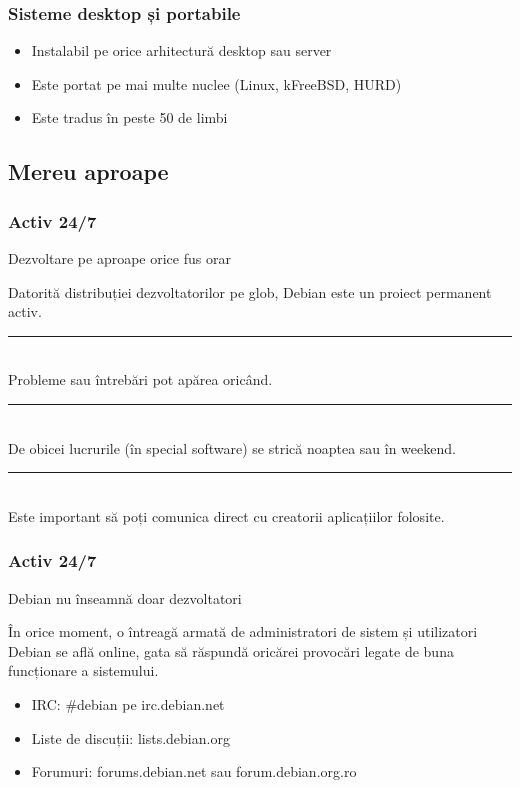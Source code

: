 \documentclass[xcolor=dvipsnames]{beamer}
\begin{document}
\begin{frame}
\frametitle{Sisteme desktop și portabile}
	\begin{itemize}
		\item Instalabil pe orice arhitectură desktop sau server\\
		\item Este portat pe mai multe nuclee (Linux, kFreeBSD, HURD)\\
		\item Este tradus în peste 50 de limbi\\
	\end{itemize}
\end{frame}

\subsection{Mereu aproape}
\begin{frame}
\frametitle{Activ 24/7}
\begin{block}
{Dezvoltare pe aproape orice fus orar}
\begin{small}\begin{center}
Datorită distribuției dezvoltatorilor pe glob, Debian este un proiect \color{darkred}permanent activ.\\
\color{darkred}\rule{3cm}{1pt}\\
\color{black}Probleme sau întrebări pot apărea oricând.\\
\color{darkred}\rule{4cm}{1pt}\\
\color{black}De obicei lucrurile (în special software) se strică noaptea sau în weekend.\\
\color{darkred}\rule{4cm}{1pt}\\
\color{black}Este important să poți comunica direct cu creatorii aplicațiilor folosite.
\end{center}
\end{small}
\end{block}
\end{frame}

\begin{frame}
\frametitle{Activ 24/7}
\begin{block}
{Debian nu înseamnă doar dezvoltatori}
\begin{small}
În orice moment, o întreagă armată de administratori de sistem și utilizatori Debian se află online, gata să răspundă oricărei provocări legate de buna funcționare a sistemului.
	\begin{itemize}
		\item IRC: \#debian pe \color{darkred}irc.debian.net\\
		\item \color{black}Liste de discuții: \color{darkred}lists.debian.org\\
		\item \color{black}Forumuri: \color{darkred}forums.debian.net \color{black}sau \color{darkred}forum.debian.org.ro\\
	\end{itemize}
\end{small}
\end{block}
\end{frame}
\end{document}
